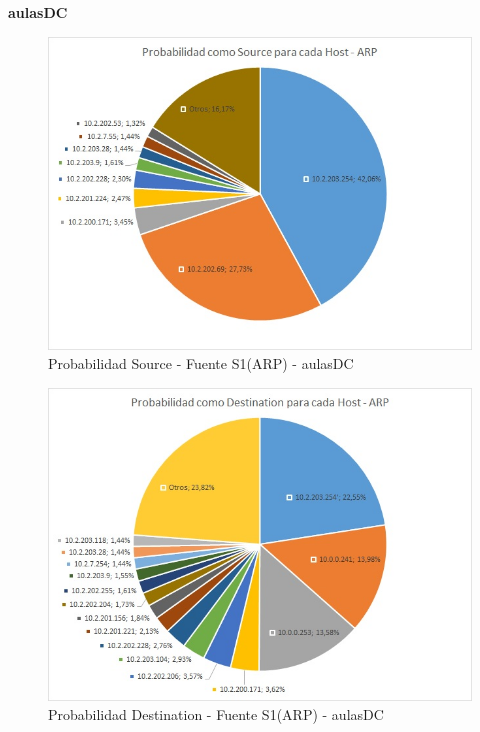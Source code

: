 \textbf{aulasDC}
\begin{figure}[h!]
\centering
\includegraphics[scale=0.6]{./img/proba_src_aulasDC.jpg}
\caption{Probabilidad Source - Fuente S1(ARP) - aulasDC}
\end{figure}

\begin{figure}[h!]
\centering
\includegraphics[scale=0.6]{./img/proba_dst_aulasDC.jpg}
\caption{Probabilidad Destination - Fuente S1(ARP) - aulasDC}
\end{figure}
\newpage



